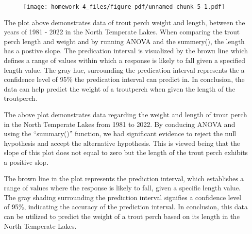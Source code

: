\documentclass[
  letterpaper,
  DIV=11,
  numbers=noendperiod]{scrartcl}
\begin{document}
\begin{figure}[H]

{\centering \texttt{[image: homework-4\_files/figure-pdf/unnamed-chunk-5-1.pdf]}

}

\end{figure}

The plot above demonstrates data of trout perch weight and length,
between the years of 1981 - 2022 in the North Temperate Lakes. When
comparing the trout perch length and weight and by running ANOVA and the
summery(), the length has a postive slope. The predication interval is
visualized by the brown line which defines a range of values within
which a response is likely to fall given a specified length value. The
gray hue, surrounding the predication interval represents the a
confidence level of 95\% the predication interval can predict in. In
conclusion, the data can help predict the weight of a troutperch when
given the length of the troutperch.

The above plot demonstrates data regarding the weight and length of
trout perch in the North Temperate Lakes from 1981 to 2022. By conducing
ANOVA and using the ``summary()'' function, we had significant evidence
to reject the null hypothesis and accept the alternative hypothesis.
This is viewed being that the slope of this plot does not equal to zero
but the length of the trout perch exhibits a positive slop.

The brown line in the plot represents the prediction interval, which
establishes a range of values where the response is likely to fall,
given a specific length value. The gray shading surrounding the
prediction interval signifies a confidence level of 95\%, indicating the
accuracy of the prediction interval. In conclusion, this data can be
utilized to predict the weight of a trout perch based on its length in
the North Temperate Lakes.
\end{document}
